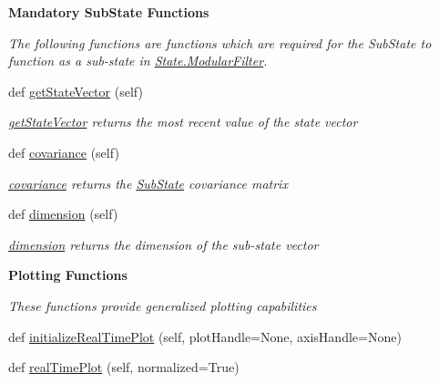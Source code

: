 \begin{Indent}{\bf Mandatory Sub\+State Functions}\par
{\em The following functions are functions which are required for the Sub\+State to function as a sub-\/state in \hyperlink{classState_1_1ModularFilter}{State.\+Modular\+Filter}. }\begin{DoxyCompactItemize}
\item 
def \hyperlink{classSubStates_1_1SubState_a3ebd1a120f63ed477ee76999518a8828}{get\+State\+Vector} (self)
\begin{DoxyCompactList}\small\item\em \hyperlink{classSubStates_1_1SubState_a3ebd1a120f63ed477ee76999518a8828}{get\+State\+Vector} returns the most recent value of the state vector \end{DoxyCompactList}\item 
def \hyperlink{classSubStates_1_1SubState_a4d863939fdb98b2739e1e737ec7496ae}{covariance} (self)
\begin{DoxyCompactList}\small\item\em \hyperlink{classSubStates_1_1SubState_a4d863939fdb98b2739e1e737ec7496ae}{covariance} returns the \hyperlink{classSubStates_1_1SubState}{Sub\+State} covariance matrix \end{DoxyCompactList}\item 
def \hyperlink{classSubStates_1_1SubState_a4aebea19a134cb871a7c0b6c2709546a}{dimension} (self)
\begin{DoxyCompactList}\small\item\em \hyperlink{classSubStates_1_1SubState_a4aebea19a134cb871a7c0b6c2709546a}{dimension} returns the dimension of the sub-\/state vector \end{DoxyCompactList}\end{DoxyCompactItemize}
\end{Indent}
\begin{Indent}{\bf Plotting Functions}\par
{\em These functions provide generalized plotting capabilities }\begin{DoxyCompactItemize}
\item 
def \hyperlink{classSubStates_1_1SubState_ab1767fb43256809f722a9f6dc73fef19}{initialize\+Real\+Time\+Plot} (self, plot\+Handle=None, axis\+Handle=None)
\item 
def \hyperlink{classSubStates_1_1SubState_a8df931305220bef14684e76fd6743b0d}{real\+Time\+Plot} (self, normalized=True)
\end{DoxyCompactItemize}
\end{Indent}
